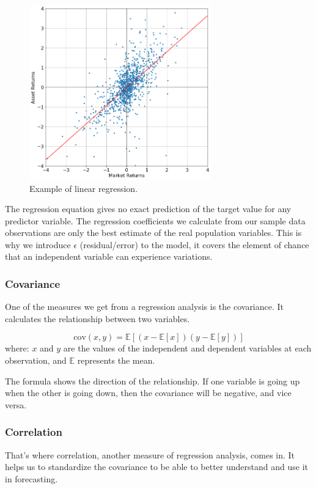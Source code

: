 \begin{figure}[htbp]
	\centering
	\includegraphics[width=0.7\textwidth]{figures/linear_regression}
	\caption{Example of linear regression.}
	\label{fig:linear_regression_example}
\end{figure}

The regression equation gives no exact prediction of the target value for any predictor variable. The regression coefficients we calculate from our sample data observations are only the best estimate of the real population variables.
This is why we introduce $\epsilon$ (residual/error) to the model, it covers the element of chance that an independent variable can experience variations.

\subsubsection{Covariance}
One of the measures we get from a regression analysis is the covariance. It calculates the relationship between two variables.

\begin{equation}
\textrm{cov}(x, y) = \mathbb{E}[(x - \mathbb{E}[x])(y - \mathbb{E}[y])]
\end{equation}
where: $x$ and $y$ are the values of the independent and dependent variables at each observation, and $\mathbb{E}$ represents the mean.

The formula shows the direction of the relationship. If one variable is going up when the other is going down, then the covariance will be negative, and vice versa.

\subsubsection{Correlation}
That’s where correlation, another measure of regression analysis, comes in. It helps us to standardize the covariance to be able to better understand and use it in forecasting.


